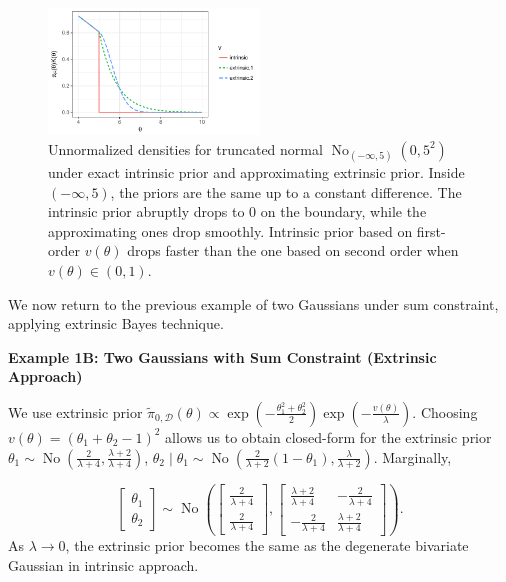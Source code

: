 \documentclass[10pt]{article}
\newcommand{\mc}[1]{\mathcal{#1}}
\DeclareMathOperator{\No}{No}
\DeclareMathOperator{\1}{\mathbbm{1}}
\begin{document}
\begin{figure}[H]
 \centering
 \includegraphics[width=0.5\textwidth]{density_truncated_normal}
\caption{Unnormalized densities for truncated normal $\No_{(-\infty,5)}(0,5^2)$ under exact intrinsic prior and approximating extrinsic prior. Inside $(-\infty,5)$, the priors are the same up to a constant difference. The intrinsic prior abruptly drops to $0$ on the boundary, while the approximating ones drop smoothly. Intrinsic prior based on first-order $v(\theta)$ drops faster than the one based on second order when $v(\theta)\in (0,1)$.}
\label{truncated_normal}
\end{figure}

We now return to the previous example of two Gaussians under sum constraint, applying extrinsic Bayes technique.

{\bf Example 1B: Two Gaussians with Sum Constraint (Extrinsic Approach)}

We use extrinsic prior $\tilde\pi_{0,\mc D}(\theta) \propto \exp(-\frac{\theta_1^2+\theta_2^2}{2})\exp(-\frac{v(\theta)}{\lambda})$. Choosing $v(\theta)= (\theta_1+\theta_2-1)^2$ allows us to obtain closed-form for the extrinsic prior $\theta_1 \sim \No(\frac{2}{\lambda+4},\frac{\lambda+2}{\lambda+4})$, $\theta_2\mid \theta_1 \sim \No(\frac{2}{\lambda+2}(1-\theta_1),\frac{\lambda}{\lambda+2})$. Marginally, 

$$\begin{bmatrix} \theta_1 \\ \theta_2 \end{bmatrix} \sim
\No \left(
 \begin{bmatrix} \frac{2}{\lambda+4} \\ \frac{2}{\lambda+4} \end{bmatrix},
\begin{bmatrix} \frac{\lambda+2}{\lambda+4} & -\frac{2}{\lambda+4}  \\  -\frac{2}{\lambda+4}  &\frac{\lambda+2}{\lambda+4} \end{bmatrix}
\right).$$
As $\lambda\rightarrow 0$, the extrinsic prior becomes the same as the degenerate bivariate Gaussian in intrinsic approach.
\end{document}
